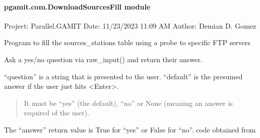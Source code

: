 \documentclass[letterpaper,10pt,english]{sphinxmanual}
\begin{document}
\paragraph{pgamit.com.DownloadSourcesFill module}
\label{\detokenize{pgamit.com:module-pgamit.com.DownloadSourcesFill}}\label{\detokenize{pgamit.com:pgamit-com-downloadsourcesfill-module}}
\sphinxAtStartPar
Project: Parallel.GAMIT
Date: 11/23/2023 11:09 AM
Author: Demian D. Gomez

\sphinxAtStartPar
Program to fill the sources\_stations table using a probe to specific FTP servers

\begin{fulllineitems}
\label{\detokenize{pgamit.com:pgamit.com.DownloadSourcesFill.main}}
\pysigstartsignatures
\pysiglinewithargsret
{}
{}
{}
\pysigstopsignatures
\end{fulllineitems}


\begin{fulllineitems}
\label{\detokenize{pgamit.com:pgamit.com.DownloadSourcesFill.query_yes_no}}
\pysigstartsignatures
\pysiglinewithargsret
{}
{\sphinxparamcomma {}}
{}
\pysigstopsignatures
\sphinxAtStartPar
Ask a yes/no question via raw\_input() and return their answer.

\sphinxAtStartPar
“question” is a string that is presented to the user.
“default” is the presumed answer if the user just hits \textless{}Enter\textgreater{}.
\begin{quote}

\sphinxAtStartPar
It must be “yes” (the default), “no” or None (meaning
an answer is required of the user).
\end{quote}

\sphinxAtStartPar
The “answer” return value is True for “yes” or False for “no”.
code obtained from 

\end{fulllineitems}
\end{document}
